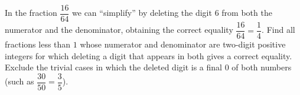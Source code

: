 In the fraction $\dfrac{16}{64}$ we can ``simplify'' by deleting the digit $6$ from both the numerator and the denominator, obtaining the correct equality $\dfrac{16}{64}=\dfrac14$. Find all fractions less than $1$ whose numerator and denominator are two-digit positive integers for which deleting a digit that appears in both gives a correct equality. Exclude the trivial cases in which the deleted digit is a final $0$ of both numbers (such as $\dfrac{30}{50}=\dfrac35$).
